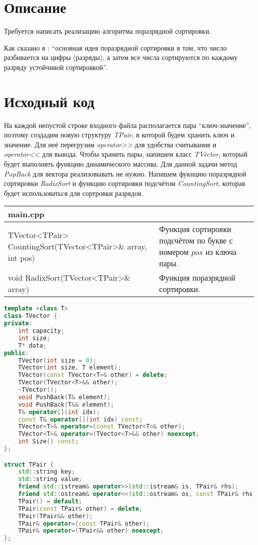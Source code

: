 \section{Описание}
Требуется написать реализацию алгоритма поразрядной	сортировки.

Как сказано в \cite{Kormen}: \enquote{основная идея поразрядной сортировки в том, что число разбивается на цифры (разряды), а затем все числа сортируются
по каждому разряду устойчивой сортировкой}.

\pagebreak

\section{Исходный код}
На каждой непустой строке входного файла располагается пара \enquote{ключ-значение}, поэтому создадим новую 
структуру \textit{TPair}, в которой будем хранить ключ и значение. Для неё перегрузим \textit{operator>>} для удобства
считывания и \textit{operator<<} для вывода. Чтобы хранить пары, напишем класс \textit{TVector}, который будет
выполнять функцию динамического массива. Для данной задачи метод \textit{PopBack} для вектора реализовывать не нужно.
Напишем фукнцию поразрядной сортировки \textit{RadixSort} и функцию сортировки подсчётом \textit{CountingSort}, которая будет использоваться для сортровки разрядов.

\begin{longtable}{|p{7.5cm}|p{7.5cm}|}
\hline
\rowcolor{lightgray}
\multicolumn{2}{|c|} {main.cpp}\\
\hline
TVector<TPair> CountingSort(TVector<TPair>\& array, int pos)&Функция сортировки подсчётом по букве с номером $pos$ из ключа пары.\\
\hline
void RadixSort(TVector<TPair>\& array)&Функция поразрядной сортировки.\\
\hline
\end{longtable}
\begin{lstlisting}[language=C++]
template <class T>
class TVector {
private:
	int capacity;
	int size;
	T* data;
public:
	TVector(int size = 0);
	TVector(int size, T element);
	TVector(const TVector<T>& other) = delete;
	TVector(TVector<T>&& other);
	~TVector();
	void PushBack(T& element);
	void PushBack(T&& element);
	T& operator[](int idx);
	const T& operator[](int idx) const;
	TVector<T>& operator=(const TVector<T>& other);
	TVector<T>& operator=(TVector<T>&& other) noexcept;
	int Size() const;
};

struct TPair {
	std::string key;
	std::string value;
	friend std::istream& operator>>(std::istream& is, TPair& rhs);
	friend std::ostream& operator<<(std::ostream& os, const TPair& rhs);
	TPair() = default;
	TPair(const TPair& other) = delete;
	TPair(TPair&& other);
	TPair& operator=(const TPair& other);
	TPair& operator=(TPair&& other) noexcept;
};
\end{lstlisting}
\pagebreak

